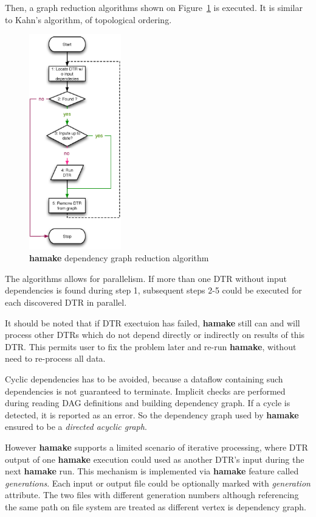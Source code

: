 \documentclass[10pt,conference,letterpaper]{IEEEtran}
\begin{document}
Then, a graph reduction algorithms shown on Figure~\ref{fig:grred} is
executed. It is similar to Kahn's algorithm\cite{kahn1962topological},
of topological ordering.

\begin{figure}[htp]
\centering
\includegraphics[width=4cm]{GraphReduction.eps}
\caption{\textbf{hamake} dependency graph reduction algorithm}
\label{fig:grred}
\end{figure}

The algorithms allows for parallelism. If more than one DTR without
input dependencies is found during step 1, subsequent steps 2-5 could
be executed for each discovered DTR in parallel.

It should be noted that if DTR exectuion has failed, \textbf{hamake} still can
and will process other DTRs which do not depend directly or indirectly
on results of this DTR. This permits user to fix the problem later and
re-run \textbf{hamake}, without need to re-process all data.

Cyclic dependencies has to be avoided, because a dataflow containing
such dependencies is not guaranteed to terminate. Implicit checks are
performed during reading DAG definitions and building dependency
graph. If a cycle is detected, it is reported as an error. So the
dependency graph used by \textbf{hamake} ensured to be a
\textit{directed acyclic graph}.

However \textbf{hamake} supports a limited scenario of iterative
processing, where DTR output of one \textbf{hamake} execution could used as
another DTR's input during the next \textbf{hamake} run. This mechanism is
implemented via \textbf{hamake} feature called
\textit{generations}. Each input or output file could be optionally
marked with \emph{generation} attribute. The two files with different
generation numbers although referencing the same path on file system
are treated as different vertex is dependency graph.
\end{document}
